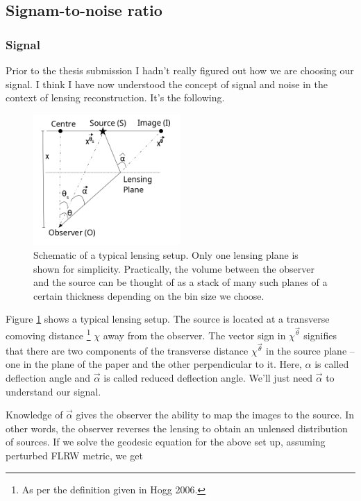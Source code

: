 \documentclass[12pt]{article}
\numberwithin{equation}{section}
\begin{document}
\subsection{Signam-to-noise ratio}
\subsubsection{Signal}
Prior to the thesis submission I hadn't really figured out how we are choosing our signal. I think I have now understood the concept of signal and noise in the context of lensing reconstruction. It's the following.

\begin{figure}[tbp]
	\centering
	\includegraphics[width = 0.5\textwidth]{lensing_schematic}
	\caption{Schematic of a typical lensing setup. Only one lensing plane is shown for simplicity. Practically, the volume between the observer and the source can be thought of as a stack of many such planes of a certain thickness depending on the bin size we choose.}
	\label{fig:lensing_schematic}
\end{figure}

Figure \ref{fig:lensing_schematic} shows a typical lensing setup. The source is located at a transverse comoving distance \footnote{As per the definition given in Hogg 2006.} $ \chi $ away from the observer. The vector sign in $ \chi^{\vec{\theta}} $ signifies that there are two components of the transverse distance $ \chi^{\vec{\theta}} $ in the source plane -- one in the plane of the paper and the other perpendicular to it. Here, $ \hat{\alpha} $ is called deflection angle and $ \vec{\alpha} $ is called reduced deflection angle. We'll just need $ \vec{\alpha} $ to understand our signal.

Knowledge of $ \vec{\alpha} $ gives the observer the ability to map the images to the source. In other words, the observer reverses the lensing to obtain an unlensed distribution of sources. If we solve the  geodesic equation for the above set up, assuming perturbed FLRW metric, we get
\end{document}

